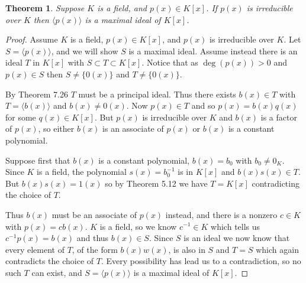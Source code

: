 \documentclass[letterpaper, 12pt]{article}
\newcommand{\pid}[1]{\langle #1 \rangle}
\newtheorem{thm}{Theorem}
\begin{document}
			\setcounter{thm}{10}
			\begin{thm}
			Suppose $K$ is a field, and $p(x) \in K[x]$. 
			If $p(x)$ is irreducible over $K$ then $\pid{p(x)}$ is a maximal ideal of $K[x]$.
			\end{thm}
			\color{ForestGreen}
			\begin{proof}
			Assume $K$ is a field, $p(x) \in K[x]$, and $p(x)$ is irreducible over $K$. 
			Let $S = \pid{p(x)}$, and we will show $S$ is a maximal ideal. 
			Assume instead there is an ideal $T$ in $K[x]$ with $S \subset T \subset K[x]$. 
			Notice that as $\deg(p(x)) > 0$ and $p(x) \in S$ then $S \neq \{0(x)\}$ and $T \neq \{0(x)\}$.

			By Theorem 7.26 $T$ must be a principal ideal. 
			Thus there exists $b(x) \in T$ with $T = \pid{b(x)}$ and $b(x) \neq 0(x)$. 
			Now $p(x) \in T$ and so $p(x) = b(x)q(x)$ for some $q(x) \in K[x]$. 
			But $p(x)$ is irreducible over $K$ and $b(x)$ is a factor of $p(x)$, so either $b(x)$ is an associate of $p(x)$ or $b(x)$ is a constant polynomial.

			Suppose first that $b(x)$ is a constant polynomial, $b(x) = b_{0}$ with $b_{0} \neq 0_{K}$. 
			Since $K$ is a field, the polynomial $s(x) = b_{0}^{-1}$ is in $K[x]$ and $b(x)s(x) \in T$. 
			But $b(x)s(x) = 1(x)$ so by Theorem 5.12 we have $T = K[x]$ contradicting the choice of $T$.

			Thus $b(x)$ must be an associate of $p(x)$ instead, and there is a nonzero $c \in K$ with $p(x) = cb(x)$. 
			$K$ is a field, so we know $c^{-1} \in K$ which tells us $c^{-1}p(x) = b(x)$ and thus $b(x) \in S$. 
			Since $S$ is an ideal we now know that every element of $T$, of the form $b(x)w(x)$, is also in $S$ and $T = S$ which again contradicts the choice of $T$. 
			Every possibility has lead us to a contradiction, so no such $T$ can exist, and $S = \pid{p(x)}$ is a maximal ideal of $K[x]$.
			\end{proof}
			\color{black}
\end{document}
